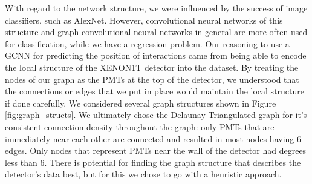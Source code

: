 \par With regard to the network structure, we were influenced by the success of image classifiers, such as AlexNet.
However, convolutional neural networks of this structure and graph convolutional neural networks in general are more often used for classification, while we have a regression problem.
Our reasoning to use a GCNN for predicting the position of interactions came from being able to encode the local structure of the XENON1T detector into the dataset.
By treating the nodes of our graph as the PMTs at the top of the detector, we understood that the connections or edges that we put in place would maintain the local structure if done carefully.
We considered several graph structures shown in Figure \ref{fig:graph_structs}.
We ultimately chose the Delaunay Triangulated graph for it's consistent connection density throughout the graph: only PMTs that are immediately near each other are connected and resulted in most nodes having 6 edges.
Only nodes that represent PMTs near the wall of the detector had degrees less than 6.
There is potential for finding the graph structure that describes the detector's data best, but for this we chose to go with a heuristic approach.
